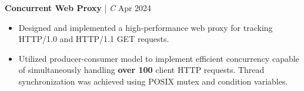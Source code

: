\textbf{Concurrent Web Proxy} | \textit{C} \hfill Apr 2024 \par
\begin{itemize}
	\item Designed and implemented a high-performance web proxy for tracking HTTP/1.0 and HTTP/1.1 GET requests.
	\item Utilized producer-consumer model to implement efficient concurrency capable of simultaneously handling \textbf{over 100} client HTTP requests. Thread synchronization was achieved using POSIX mutex and condition variables.
\end{itemize} \par